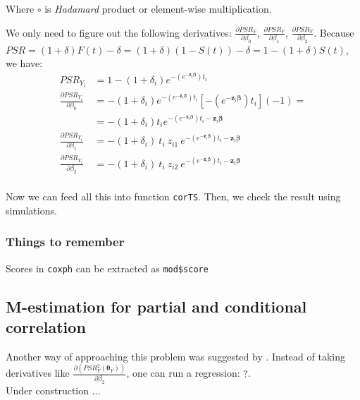\documentclass[]{article}
\begin{document}
Where $\circ$ is \emph{Hadamard} product or element-wise multiplication.

We only need to figure out the following derivatives: $\frac{\partial PSR_Y}{\partial \beta_0}$, $\frac{\partial PSR_Y}{\partial \beta_1}$, $\frac{\partial PSR_Y}{\partial \beta_2}$. Because $PSR = (1+\delta)F(t) - \delta = (1+\delta)(1 - S(t)) - \delta = 1 - (1+\delta)S(t)$, we have:
  $$
  \begin{aligned}
    PSR_{Y_i} &=  1 - (1+\delta_i)e^{-(e^{-\pmb{z}_i \pmb{\beta}})t_i} \\
    \frac{\partial PSR_{Y_i}}{\partial \beta_0} &= - (1+\delta_i)e^{-(e^{-\pmb{z}_i \pmb{\beta}})t_i}  \left[ -(e^{-\pmb{z}_i \pmb{\beta}})t_i \right] (-1)=\\
    &= - (1+\delta_i)t_i e^{-(e^{-\pmb{z}_i \pmb{\beta}})t_i-\pmb{z}_i \pmb{\beta}}\\
    \frac{\partial PSR_{Y_i}}{\partial \beta_1} &= - (1+\delta_i)~t_i ~z_{i1}~ e^{-(e^{-\pmb{z}_i \pmb{\beta}})t_i -\pmb{z}_i \pmb{\beta}}\\
    \frac{\partial PSR_{Y_i}}{\partial \beta_2} &= - (1+\delta_i)~t_i ~z_{i2}~ e^{-(e^{-\pmb{z}_i \pmb{\beta}})t_i -\pmb{z}_i \pmb{\beta}}\\
  \end{aligned}
  $$

Now we can feed all this into function \texttt{corTS}. Then, we check the result using simulations.



\subsubsection{Things to remember}
Scores in \texttt{coxph} can be extracted as \texttt{mod\$score}
\clearpage

\subsection{M-estimation for partial and conditional correlation}
Another way of approaching this problem was suggested by \cite{lui2015covariate}. Instead of taking derivatives like $\frac{\partial (PSR_Y^2(\pmb{\theta}_Y))}{\partial \beta_2}$, one can run a regression: $?$.\\
Under construction ...


%

\printbibliography
\end{document}
